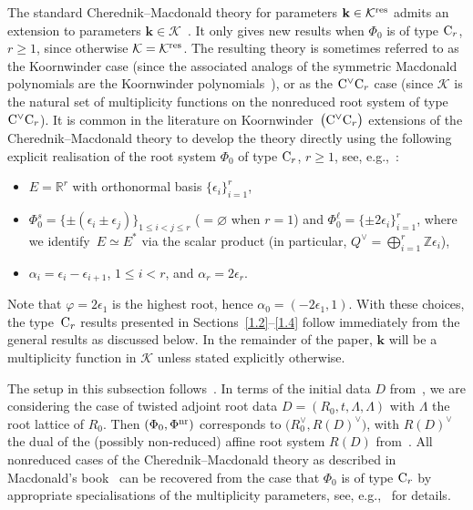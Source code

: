 The standard Cherednik--Macdonald theory for parameters $\mathbf{k}\in\mathcal{K}^{{\rm res}}$ admits an extension to
parameters $\mathbf{k}\in\mathcal{K}$~\cite{No,Sa}. It only gives new results when $\Phi_0$ is of type ${\rm C}_r$, $r\geq 1$, since otherwise $\mathcal{K}=\mathcal{K}^{{\rm res}}$.
The resulting theory is sometimes referred to as the Koornwinder case \big(since the associated analogs of the symmetric Macdonald polynomials are the Koornwinder polynomials~\cite{Ko}\big), or as the ${\rm C}^\vee{\rm C}_r$ case (since $\mathcal{K}$ is the natural set of multiplicity functions on the nonreduced root system of type
${\rm C}^\vee{\rm C}_r$).
It is common in the literature on Koornwinder~$\big({\rm C}^\vee{\rm C}_r\big)$ extensions of the Cherednik--Macdonald theory
to develop the theory directly using the following explicit realisation of the root system $\Phi_0$ of type ${\rm C}_r$, $r\geq 1$, see, e.g.,~\cite{Ko,No,Sa,St}:
\begin{itemize}\itemsep=0pt
\item $E=\mathbb{R}^r$ with orthonormal basis $\{\epsilon_i\}_{i=1}^r$,
\item $\Phi_0^s=\{\pm(\epsilon_i\pm\epsilon_j)\}_{1\leq i<j\leq r}$ ($=\varnothing$ when $r=1$) and $\Phi_0^\ell=\{\pm 2\epsilon_i\}_{i=1}^r$, where we identify~${E\simeq E^*}$
via the scalar product \big(in particular, $Q^\vee=\bigoplus_{i=1}^r\mathbb{Z}\epsilon_i$\big),
\item $\alpha_i=\epsilon_i-\epsilon_{i+1}$, $1\leq i<r$, and $\alpha_r=2\epsilon_r$.
\end{itemize}
Note that
$\varphi=2\epsilon_1$ is the highest root, hence $\alpha_0=(-2\epsilon_1,1)$. With these choices, the type~${\rm C}_r$ results presented in Sections~\ref{1.2}--\ref{1.4} follow immediately from the general results as discussed below. In the remainder of the paper, $\mathbf{k}$ will be a multiplicity function in $\mathcal{K}$ unless stated explicitly otherwise.

\begin{Remark}
The setup in this subsection follows~\cite{StAM, StCh}. In terms of the initial data $D$ from~\cite[Section~1.1]{StAM}, we are considering the case of twisted adjoint root data $D=(R_0,t,\Lambda,\Lambda)$ with $\Lambda$ the root lattice of $R_0$. Then
$(\Phi_0,\Phi^{\textup{nr}})$ corresponds to $\bigl(R_0^\vee,R(D)^\vee\bigr)$, with $R(D)^\vee$ the dual of the (possibly non-reduced) affine root system $R(D)$ from~\cite[Section~1.1]{StAM}. All nonreduced cases of the Cherednik--Macdonald theory as described in Macdonald's book~\cite{Ma} can be recovered from the case that $\Phi_0$ is of type ${\rm C}_r$ by appropriate specialisations of the multiplicity parameters, see, e.g.,~\cite[Section~9.2.3]{StCh} for details.
\end{Remark}



